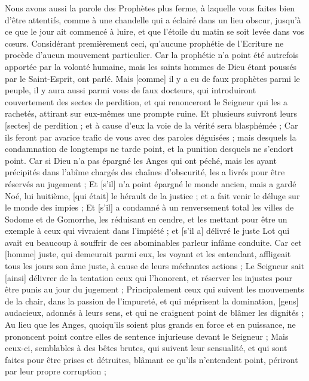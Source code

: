 \begin{multicols}{2}
Nous avons aussi la parole des Prophètes plus ferme, à laquelle vous faites bien d'être attentifs, comme à une chandelle qui a éclairé dans un lieu obscur, jusqu'à ce que le jour ait commencé à luire, et que l'étoile du matin se soit levée dans vos cœurs.
Considérant premièrement ceci, qu'aucune prophétie de l'Ecriture ne procède d'aucun mouvement particulier.
Car la prophétie n'a point été autrefois apportée par la volonté humaine, mais les saints hommes de Dieu étant poussés par le Saint-Esprit, ont parlé.
\VerseOne{}Mais [comme] il y a eu de faux prophètes parmi le peuple, il y aura aussi parmi vous de faux docteurs, qui introduiront couvertement des sectes de perdition, et qui renonceront le Seigneur qui les a rachetés, attirant sur eux-mêmes une prompte ruine.
Et plusieurs suivront leurs [sectes] de perdition ; et à cause d'eux la voie de la vérité sera blasphémée ;
Car ils feront par avarice trafic de vous avec des paroles déguisées ; mais desquels la condamnation de longtemps ne tarde point, et la punition desquels ne s'endort point.
Car si Dieu n'a pas épargné les Anges qui ont péché, mais les ayant précipités dans l'abîme chargés des chaînes d'obscurité, les a livrés pour être réservés au jugement ;
Et [s'il] n'a point épargné le monde ancien, mais a gardé Noé, lui huitième, [qui était] le hérault de la justice ; et a fait venir le déluge sur le monde des impies ;
Et [s'il] a condamné à un renversement total les villes de Sodome et de Gomorrhe, les réduisant en cendre, et les mettant pour être un exemple à ceux qui vivraient dans l'impiété ;
et [s'il a] délivré le juste Lot qui avait eu beaucoup à souffrir de ces abominables parleur infâme conduite.
Car cet [homme] juste, qui demeurait parmi eux, les voyant et les entendant, affligeait tous les jours son âme juste, à cause de leurs méchantes actions ;
Le Seigneur sait [ainsi] délivrer de la tentation ceux qui l'honorent, et réserver les injustes pour être punis au jour du jugement ;
Principalement ceux qui suivent les mouvements de la chair, dans la passion de l'impureté, et qui méprisent la domination, [gens] audacieux, adonnés à leurs sens, et qui ne craignent point de blâmer les dignités ;
Au lieu que les Anges, quoiqu'ils soient plus grands en force et en puissance, ne prononcent point contre elles de sentence injurieuse devant le Seigneur ;
Mais ceux-ci, semblables à des bêtes brutes, qui suivent leur sensualité, et qui sont faites pour être prises et détruites, blâmant ce qu'ils n'entendent point, périront par leur propre corruption ;

\end{multicols}
